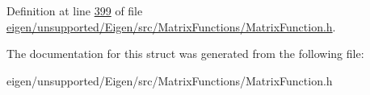 Definition at line \hyperlink{eigen_2unsupported_2_eigen_2src_2_matrix_functions_2_matrix_function_8h_source_l00399}{399} of file \hyperlink{eigen_2unsupported_2_eigen_2src_2_matrix_functions_2_matrix_function_8h_source}{eigen/unsupported/\+Eigen/src/\+Matrix\+Functions/\+Matrix\+Function.\+h}.



The documentation for this struct was generated from the following file\+:\begin{DoxyCompactItemize}
\item 
eigen/unsupported/\+Eigen/src/\+Matrix\+Functions/\+Matrix\+Function.\+h\end{DoxyCompactItemize}
